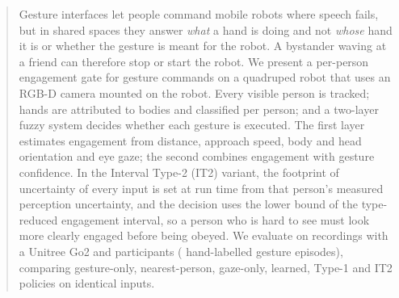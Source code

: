 \begin{abstract}
Gesture interfaces let people command mobile robots where speech fails, but
in shared spaces they answer \emph{what} a hand is doing and not \emph{whose}
hand it is or whether the gesture is meant for the robot. A bystander waving
at a friend can therefore stop or start the robot. We present a per-person
engagement gate for gesture commands on a quadruped robot that uses an RGB-D
camera mounted on the robot. Every visible person is tracked; hands are attributed to
bodies and classified per person; and a two-layer fuzzy system decides whether
each gesture is executed. The first layer estimates engagement from distance,
approach speed, body and head orientation and eye gaze; the second combines
engagement with gesture confidence. In the Interval Type-2 (IT2) variant, the
footprint of uncertainty of every input is set at run time from that person's
measured perception uncertainty, and the decision uses the lower bound of the
type-reduced engagement interval, so a person who is hard to see must look
more clearly engaged before being obeyed. We evaluate on
 recordings with a Unitree Go2 and  participants
( hand-labelled gesture episodes), comparing gesture-only,
nearest-person, gaze-only, learned, Type-1 and IT2 policies on identical
inputs. 
\end{abstract}

